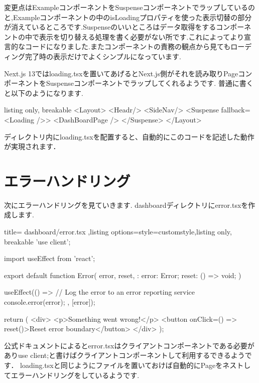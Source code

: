 変更点はExampleコンポーネントをSuspenseコンポーネントでラップしているのと,Exampleコンポーネントの中のisLoadingプロパティを使った表示切替の部分が消えているところです.Suspenseのいいところはデータ取得をするコンポーネントの中で表示を切り替える処理を書く必要がない所です.これによってより宣言的なコードになりました.またコンポーネントの責務の観点から見てもローディング完了時の表示だけでよくシンプルになっています.

Next.js 13ではloading.tsxを置いてあげるとNext.js側がそれを読み取りPageコンポーネントをSuspenseコンポーネントでラップしてくれるようです.
普通に書くと以下のようになります.



\begin{tcblisting}{listing only, breakable}
  <Layout>
  <Headr/>
  <SideNav/>
  <Suspense fallback={<Loading />}>
  <DashBoardPage />
  </Suspense>
  </Layout>
\end{tcblisting}

ディレクトリ内にloading.tsxを配置すると、自動的にこのコードを記述した動作が実現されます．



\section{エラーハンドリング}

次にエラーハンドリングを見ていきます.
dashboardディレクトリにerror.tsxを作成します.


\begin{tcblisting}{title={
        dashboard/error.tsx
      },listing options={style=customstyle},listing only, breakable}
  'use client';

  import { useEffect } from 'react';

  export default function Error({
      error,
      reset,
    }: {
  error: Error;
  reset: () => void;
  }) {
  useEffect(() => {
  // Log the error to an error reporting service
  console.error(error);
  }, [error]);

  return (
  <div>
  <p>Something went wrong!</p>
  <button onClick={() => reset()}>Reset error boundary</button>
  </div>
  );
  }
\end{tcblisting}



公式ドキュメントによるとerror.tsxはクライアントコンポーネントである必要がありuse client;と書けばクライアントコンポーネントして利用するできるようです．
loading.tsxと同じようにファイルを置いておけば自動的にPageをネストしてエラーハンドリングをしているようです.

